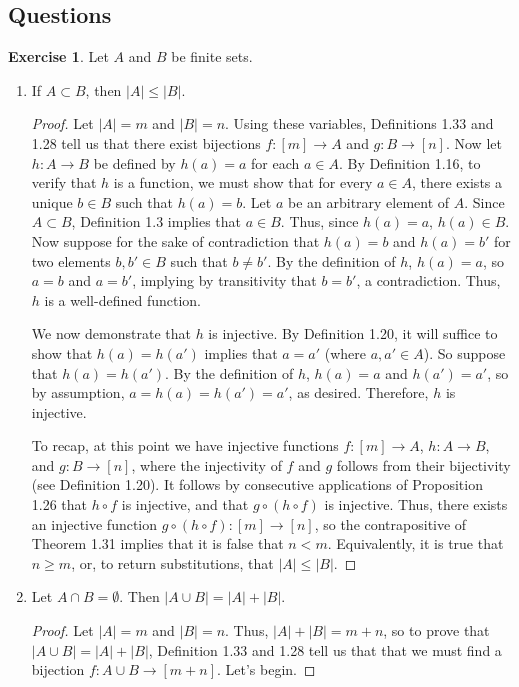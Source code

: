 \documentclass[titlepage]{article}
\newcounter{script}
\theoremstyle{definition}
\newtheorem{exercise}{Exercise}[script]
\begin{document}
\subsection{Questions}
\setcounter{exercise}{33}
\begin{exercise}
    Let $A$ and $B$ be finite sets.
    \begin{enumerate}[label={\alph*)}]
        \item If $A\subset B$, then $|A|\leq|B|$.
        \begin{proof}
            Let $|A|=m$ and $|B|=n$. Using these variables, Definitions 1.33 and 1.28 tell us that there exist bijections $f:[m]\to A$ and $g:B\to[n]$. Now let $h:A\to B$ be defined by $h(a)=a$ for each $a\in A$. By Definition 1.16, to verify that $h$ is a function, we must show that for every $a\in A$, there exists a unique $b\in B$ such that $h(a)=b$. Let $a$ be an arbitrary element of $A$. Since $A\subset B$, Definition 1.3 implies that $a\in B$. Thus, since $h(a)=a$, $h(a)\in B$. Now suppose for the sake of contradiction that $h(a)=b$ and $h(a)=b'$ for two elements $b,b'\in B$ such that $b\neq b'$. By the definition of $h$, $h(a)=a$, so $a=b$ and $a=b'$, implying by transitivity that $b=b'$, a contradiction. Thus, $h$ is a well-defined function.\par
            We now demonstrate that $h$ is injective. By Definition 1.20, it will suffice to show that $h(a)=h(a')$ implies that $a=a'$ (where $a,a'\in A$). So suppose that $h(a)=h(a')$. By the definition of $h$, $h(a)=a$ and $h(a')=a'$, so by assumption, $a=h(a)=h(a')=a'$, as desired. Therefore, $h$ is injective.\par
            To recap, at this point we have injective functions $f:[m]\to A$, $h:A\to B$, and $g:B\to [n]$, where the injectivity of $f$ and $g$ follows from their bijectivity (see Definition 1.20). It follows by consecutive applications of Proposition 1.26 that $h\circ f$ is injective, and that $g\circ (h\circ f)$ is injective. Thus, there exists an injective function $g\circ (h\circ f):[m]\to[n]$, so the contrapositive of Theorem 1.31 implies that it is false that $n<m$. Equivalently, it is true that $n\geq m$, or, to return substitutions, that $|A|\leq|B|$.
        \end{proof}
        \item Let $A\cap B=\emptyset$. Then $|A\cup B|=|A|+|B|$.
        \begin{proof}
            Let $|A|=m$ and $|B|=n$. Thus, $|A|+|B|=m+n$, so to prove that $|A\cup B|=|A|+|B|$, Definition 1.33 and 1.28 tell us that that we must find a bijection $f:A\cup B\to[m+n]$. Let's begin.\par

\end{proof}
\end{enumerate}
\end{exercise}
\end{document}
